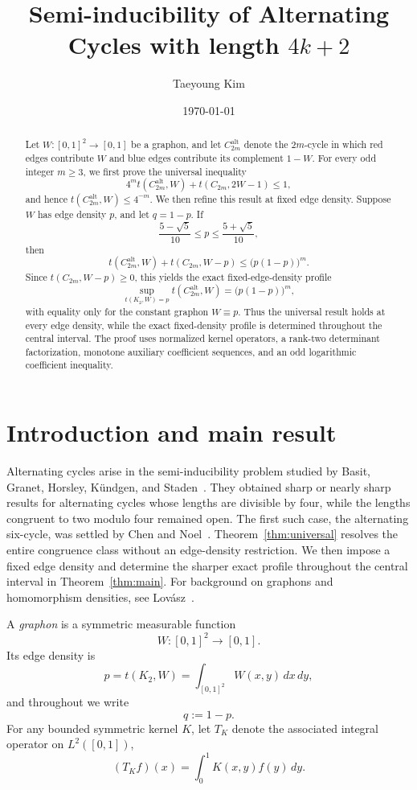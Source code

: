\documentclass[11pt]{article}
\title{Semi-inducibility of Alternating Cycles with length \texorpdfstring{$4k+2$}{4k+2}}
\author{Taeyoung Kim}
\date{\today}
\newcommand{\Alt}{\mathrm{alt}}
\begin{document}
\maketitle

\begin{abstract}
Let $W\colon[0,1]^2\to[0,1]$ be a graphon, and let $C_{2m}^{\Alt}$ denote the $2m$-cycle in which red edges contribute $W$ and blue edges contribute its complement $1-W$.  For every odd integer $m\ge3$, we first prove the universal inequality
\[
   4^m t(C_{2m}^{\Alt},W)+t(C_{2m},2W-1)\le1,
\]
and hence $t(C_{2m}^{\Alt},W)\le4^{-m}$.  We then refine this result at fixed edge density.  Suppose
$W$ has edge density $p$, and let $q=1-p$.  If
\[
   \frac{5-\sqrt5}{10}\le p\le \frac{5+\sqrt5}{10},
\]
then
\[
   t(C_{2m}^{\Alt},W)+t(C_{2m},W-p)\le \bigl(p(1-p)\bigr)^m.
\]
Since $t(C_{2m},W-p)\ge0$, this yields the exact fixed-edge-density profile
\[
   \sup_{t(K_2,W)=p}t(C_{2m}^{\Alt},W)=\bigl(p(1-p)\bigr)^m,
\]
with equality only for the constant graphon $W\equiv p$.  Thus the universal result holds at every edge density, while the exact fixed-density profile is determined throughout the central interval.  The proof uses normalized kernel operators, a rank-two determinant factorization, monotone auxiliary coefficient sequences, and an odd logarithmic coefficient inequality.
\end{abstract}

\section{Introduction and main result}

Alternating cycles arise in the semi-inducibility problem studied by Basit, Granet, Horsley,
K\"undgen, and Staden~\cite{BGHKS}.  They obtained sharp or nearly sharp results for alternating
cycles whose lengths are divisible by four, while the lengths congruent to two modulo four remained
open.  The first such case, the alternating six-cycle, was settled by Chen and
Noel~\cite{ChenNoel}.  Theorem~\ref{thm:universal} resolves the entire congruence class without an
edge-density restriction.  We then impose a fixed edge density and determine the sharper exact
profile throughout the central interval in Theorem~\ref{thm:main}.  For background on graphons and
homomorphism densities, see Lov\'asz~\cite{Lovasz}.

A \emph{graphon} is a symmetric measurable function
\[
   W\colon[0,1]^2\to[0,1].
\]
Its edge density is
\[
   p=t(K_2,W)=\int_{[0,1]^2}W(x,y)\,dx\,dy,
\]
and throughout we write
\[
   q:=1-p.
\]
For any bounded symmetric kernel $K$, let $T_K$ denote the associated integral operator on $L^2([0,1])$,
\[
   (T_K f)(x)=\int_0^1 K(x,y)f(y)\,dy.
\]
\end{document}
